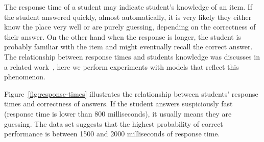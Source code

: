 The response time of a student may indicate student's knowledge of an item. If the student answered quickly, almost automatically, it is very likely they either know the place very well or are purely guessing, depending on the correctness of their answer. On the other hand when the response is longer, the student is probably familiar with the item and might eventually recall the correct answer. The relationship between response times and students knowledge was discusses in a related work~\cite{papouvsekanalysis}, here we perform experiments with models that reflect this phenomenon.

Figure~\ref{fig:response-times} illustrates the relationship between students' response times and correctness of answers. If the student answers suspiciously fast (response time is lower than 800 milliseconds), it usually means they are guessing. The data set suggests that the highest probability of correct performance is between 1500 and 2000 milliseconds of response time.

